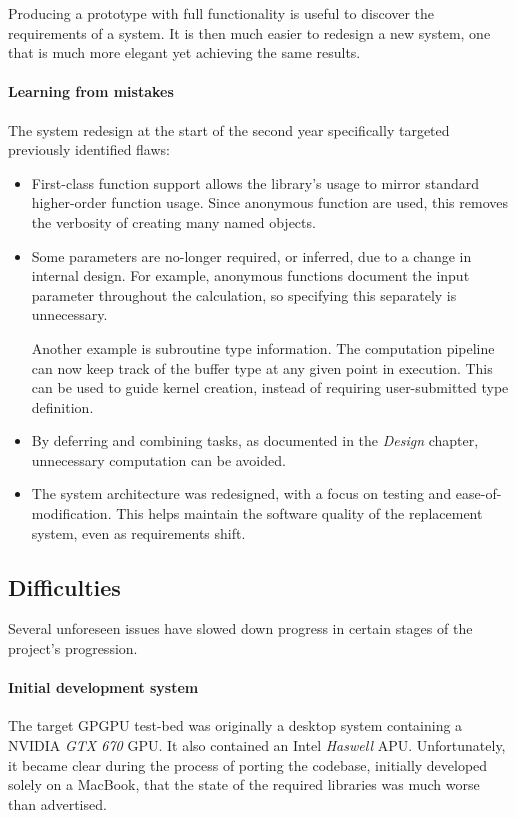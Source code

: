 Producing a prototype with full functionality is useful to discover the requirements of a system. It is then much easier to redesign a new system, one that is much more elegant yet achieving the same results.

\paragraph*{Learning from mistakes}
The system redesign at the start of the second year specifically targeted previously identified flaws:
\begin{itemize}
    \item First-class function support allows the library's usage to mirror standard higher-order function usage. Since anonymous function are used, this removes the verbosity of creating many named objects.

    \item Some parameters are no-longer required, or inferred, due to a change in internal design. For example, anonymous functions document the input parameter throughout the calculation, so specifying this separately is unnecessary.

      Another example is subroutine type information. The computation pipeline can now keep track of the buffer type at any given point in execution. This can be used to guide kernel creation, instead of requiring user-submitted type definition.

    \item By deferring and combining tasks, as documented in the \emph{Design} chapter, unnecessary computation can be avoided.

    \item The system architecture was redesigned, with a focus on testing and ease-of-modification. This helps maintain the software quality of the replacement system, even as requirements shift.
\end{itemize}

\subsection{Difficulties}
Several unforeseen issues have slowed down progress in certain stages of the project's progression.

\paragraph*{Initial development system}
The target \ac{GPGPU} test-bed was originally a desktop system containing a NVIDIA \emph{GTX 670} \ac{GPU}. It also contained an Intel \emph{Haswell} \ac{APU}. Unfortunately, it became clear during the process of porting the codebase, initially developed solely on a MacBook, that the state of the required libraries was much worse than advertised.

